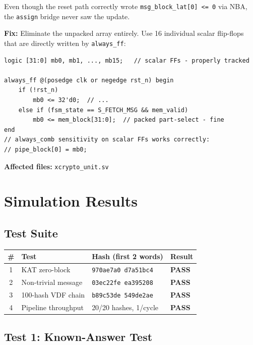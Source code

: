 \documentclass[11pt,a4paper]{article}
\begin{document}
Even though the reset path correctly wrote \texttt{msg\_block\_lat[0] <= 0}
via NBA, the \texttt{assign} bridge never saw the update.

\textbf{Fix:} Eliminate the unpacked array entirely. Use 16 individual
scalar flip-flops that are directly written by \texttt{always\_ff}:
\begin{lstlisting}
logic [31:0] mb0, mb1, ..., mb15;   // scalar FFs - properly tracked

always_ff @(posedge clk or negedge rst_n) begin
    if (!rst_n)
        mb0 <= 32'd0;  // ...
    else if (fsm_state == S_FETCH_MSG && mem_valid)
        mb0 <= mem_block[31:0];  // packed part-select - fine
end
// always_comb sensitivity on scalar FFs works correctly:
// pipe_block[0] = mb0;
\end{lstlisting}

\textbf{Affected files:} \texttt{xcrypto\_unit.sv}

\section{Simulation Results}

\subsection{Test Suite}

\begin{passbox}
\begin{center}
\begin{tabular}{clll}
\toprule
\textbf{\#} & \textbf{Test} & \textbf{Hash (first 2 words)} & \textbf{Result} \\
\midrule
1 & KAT zero-block         & \texttt{970ae7a0 d7a51bc4} & \textbf{PASS} \\
2 & Non-trivial message    & \texttt{03ec22fe ea395208} & \textbf{PASS} \\
3 & 100-hash VDF chain     & \texttt{b89c53de 549de2ae} & \textbf{PASS} \\
4 & Pipeline throughput    & 20/20 hashes, 1/cycle     & \textbf{PASS} \\
\bottomrule
\end{tabular}
\end{center}
\end{passbox}

\subsection{Test 1: Known-Answer Test}
\end{document}
